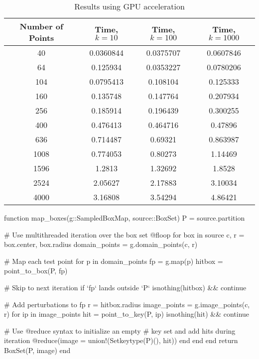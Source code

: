 \begin{table}[ht!]
    \centering
    {\footnotesize
        \begin{tabular}{| c | c c c |}
            \hline
            Number of Points & Time, $k=10$ & Time, $k=100$ & Time, $k=1000$ \\
            \hline
            40  &  0.0360844   &  0.0375707    &  0.0607846 \\
            64  &  0.125934    &  0.0353227    &  0.0780206 \\
            104  &  0.0795413   &  0.108104     &  0.125333 \\
            160  &  0.135748    &  0.147764     &  0.207934 \\
            256  &  0.185914    &  0.196439     &  0.300255 \\
            400  &  0.476413    &  0.464716     &  0.47896 \\
            636  &  0.714487    &  0.69321      &  0.863987 \\ 
            1008  &  0.774053    &  0.80273      &  1.14469 \\ 
            1596  &  1.2813      &  1.32692      &  1.8528 \\
            2524  &  2.05627     &  2.17883      &  3.10034 \\
            4000  &  3.16808     &  3.54294      &  4.86421 \\
            \hline
        \end{tabular}
    }
    \caption{Results using GPU acceleration}
    \label{tb:gpu}
\end{table}

\clearpage

\begin{jllisting}[float, floatplacement=hb!, language=julia, style=jlcodestyle, label=lst:boxmap, caption=Function to calculate $f(\mathcal{B})$]
    function map_boxes(g::SampledBoxMap, source::BoxSet)
        P = source.partition

        # Use multithreaded iteration over the box set
        @floop for box in source
            c, r = box.center, box.radius
            domain_points = g.domain_points(c, r)
            
            # Map each test point
            for p in domain_points
                fp = g.map(p)
                hitbox = point_to_box(P, fp)

                # Skip to next iteration if `fp` lands outside `P`
                isnothing(hitbox) && continue

                # Add perturbations to fp
                r = hitbox.radius
                image_points = g.image_points(c, r)
                for ip in image_points
                    hit = point_to_key(P, ip)
                    isnothing(hit) && continue
                    
                    # Use @reduce syntax to initialize an empty
                    # key set and add hits during iteration
                    @reduce(image = union!(Set{keytype(P)}(), hit))
                end
            end
        end
        return BoxSet(P, image)
    end 
\end{jllisting}

